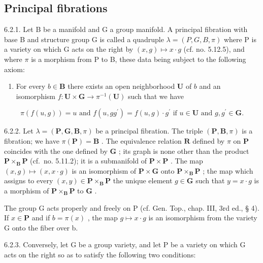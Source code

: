 \subsection{Principal fibrations}

6.2.1. Let B be a manifold and G a group manifold. A principal fibration with base B and structure group G is called a quadruple \(\lambda = (P, G, B, \pi)\) where P is a variety on which G acts on the right by \((x, g) \mapsto x \cdot g\) (cf. no. 5.12.5), and where \(\pi\) is a morphism from P to B, these data being subject to the following axiom:

\begin{enumerate}
\def\labelenumi{(\Alph{enumi})}
\setcounter{enumi}{15}
\tightlist
\item
  For every \(b \in \mathbf{B}\) there exists an open neighborhood \(\mathbf{U}\) of \(b\) and an isomorphism \(f: \mathbf{U} \times \mathbf{G} \to \pi^{-1}(\mathbf{U})\) such that we have
\end{enumerate}

\[
\pi (f (u, g)) = u \text {   and   } f (u, g g ^ {\prime}) = f (u, g) \cdot g ^ {\prime} \text {   if   } u \in \mathbf {U} \text {   and   } g, g ^ {\prime} \in \mathbf {G}.
\]

6.2.2. Let \(\lambda = (\mathbf{P}, \mathbf{G}, \mathbf{B}, \pi)\) be a principal fibration. The triple \((\mathbf{P}, \mathbf{B}, \pi)\) is a fibration; we have \(\pi(\mathbf{P}) = \mathbf{B}\) . The equivalence relation \(\mathbf{R}\) defined by \(\pi\) on \(\mathbf{P}\) coincides with the one defined by \(\mathbf{G}\) ; its graph is none other than the product \(\mathbf{P} \times_{\mathbf{B}} \mathbf{P}\) (cf.~no. 5.11.2); it is a submanifold of \(\mathbf{P} \times \mathbf{P}\) . The map \((x, g) \mapsto (x, x \cdot g)\) is an isomorphism of \(\mathbf{P} \times \mathbf{G}\) onto \(\mathbf{P} \times_{\mathbf{B}} \mathbf{P}\) ; the map which assigns to every \((x, y) \in \mathbf{P} \times_{\mathbf{B}} \mathbf{P}\) the unique element \(g \in \mathbf{G}\) such that \(y = x \cdot g\) is a morphism of \(\mathbf{P} \times_{\mathbf{B}} \mathbf{P}\) to \(\mathbf{G}\) .

The group G acts properly and freely on P (cf. Gen. Top., chap. III, 3rd ed., § 4). If \(x \in \mathbf{P}\) and if \(b = \pi(x)\) , the map \(g \mapsto x \cdot g\) is an isomorphism from the variety G onto the fiber over b.

6.2.3. Conversely, let G be a group variety, and let P be a variety on which G acts on the right so as to satisfy the following two conditions:

